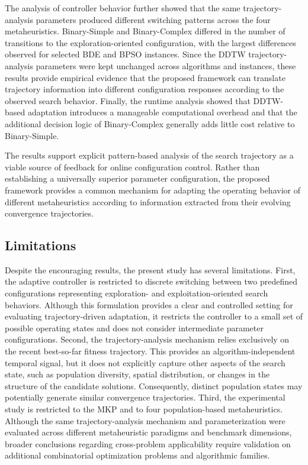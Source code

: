 \documentclass[journal,article,submit,moreauthors]{Definitions/mdpi}
\begin{document}
The analysis of controller behavior further showed that the same
trajectory-analysis parameters produced different switching patterns across
the four metaheuristics. Binary-Simple and Binary-Complex differed in the
number of transitions to the exploration-oriented configuration, with the
largest differences observed for selected BDE and BPSO instances. Since the
DDTW trajectory-analysis parameters were kept unchanged across algorithms
and instances, these results provide empirical evidence that the proposed
framework can translate trajectory information into different configuration
responses according to the observed search behavior. Finally, the runtime
analysis showed that DDTW-based adaptation introduces a manageable
computational overhead and that the additional decision logic of
Binary-Complex generally adds little cost relative to Binary-Simple.

The results support explicit pattern-based analysis of the search
trajectory as a viable source of feedback for online configuration control.
Rather than establishing a universally superior parameter configuration,
the proposed framework provides a common mechanism for adapting the
operating behavior of different metaheuristics according to information
extracted from their evolving convergence trajectories.


\subsection{Limitations}
\label{subsec:limitations}

Despite the encouraging results, the present study has several limitations.
First, the adaptive controller is restricted to discrete switching between
two predefined configurations representing exploration- and
exploitation-oriented search behaviors. Although this formulation provides
a clear and controlled setting for evaluating trajectory-driven adaptation,
it restricts the controller to a small set of possible operating states and
does not consider intermediate parameter configurations. Second, the trajectory-analysis mechanism relies exclusively on the recent best-so-far fitness trajectory. This provides an algorithm-independent temporal signal, but it does not explicitly capture other aspects of the search state, such as population diversity, spatial distribution, or changes in the structure of the candidate solutions. Consequently, distinct population states may potentially generate similar convergence trajectories. Third, the experimental study is restricted to the MKP and to four population-based metaheuristics. Although the same trajectory-analysis mechanism and parameterization were evaluated across different
metaheuristic paradigms and benchmark dimensions, broader conclusions
regarding cross-problem applicability require validation on additional
combinatorial optimization problems and algorithmic families.
\end{document}
